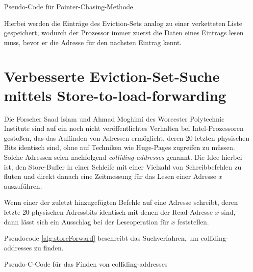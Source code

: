 \begin{algorithm}[h]
\DontPrintSemicolon
\caption{Pseudo-Code für Pointer-Chasing-Methode}
\label{alg:pointerChasing}

\end{algorithm}

Hierbei werden die Einträge des Eviction-Sets analog zu einer verketteten Liste gespeichert, wodurch der Prozessor immer zuerst die Daten eines Eintrags lesen muss, bevor er die Adresse für den nächsten Eintrag kennt.

\section{Verbesserte Eviction-Set-Suche mittels Store-to-load-forwarding}
\label{StoreFor}

Die Forscher Saad Islam und Ahmad Moghimi des Worcester Polytechnic Institute sind auf ein noch nicht veröffentlichtes Verhalten bei Intel-Prozessoren gestoßen, das das Auffinden von Adressen ermöglicht, deren 20 letzten physischen Bits identisch sind, ohne auf Techniken wie Huge-Pages zugreifen zu müssen.
Solche Adressen seien nachfolgend \textit{colliding-addresses} genannt.
Die Idee hierbei ist, den Store-Buffer in einer Schleife mit einer Vielzahl von Schreibbefehlen zu fluten und direkt danach eine Zeitmessung für das Lesen einer Adresse $x$ auszuführen.

Wenn einer der zuletzt hinzugefügten Befehle auf eine Adresse schreibt, deren letzte 20 physischen Adressbits identisch mit denen der Read-Adresse $x$ sind, dann lässt sich ein Ausschlag bei der Leseoperation für $x$ feststellen.

Pseudocode \ref{alg:storeForward} beschreibt das Suchverfahren, um colliding-addresses zu finden.

\begin{algorithm}[h]
\DontPrintSemicolon
\caption{Pseudo-C-Code für das Finden von colliding-addresses}
\label{alg:storeForward}

\end{algorithm}

